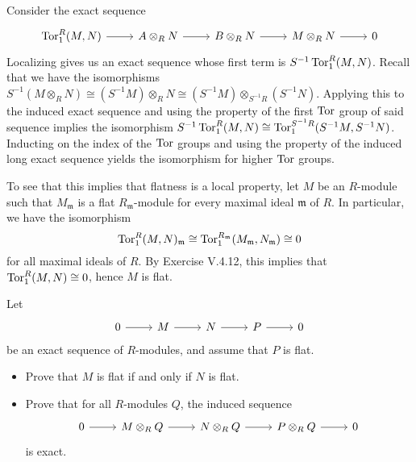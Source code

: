 \documentclass[../../master.tex]{subfiles}
\begin{document}
\begin{solution}
    Consider the exact sequence
    \[
    \begin{tikzcd}
        \Tor_1^{R}(M, N) & A \otimes_R N & B \otimes_R N & M \otimes_R N & 0
        \arrow[from=1-1, to=1-2]
        \arrow[from=1-2, to=1-3]
        \arrow[from=1-3, to=1-4]
        \arrow[from=1-4, to=1-5] 
    \end{tikzcd}
    \]
    Localizing gives us an exact sequence whose first term is $S^{-1}\operatorname{Tor}_1^{R}(M, N)$.
    Recall that we have the isomorphisms $S^{-1}(M \otimes_R N) \cong (S^{-1}M) \otimes_R N \cong (S^{-1}M) \otimes_{S^{-1}R} (S^{-1}N)$.
    Applying this to the induced exact sequence and using the property of the first $\operatorname{Tor}$ group of said sequence implies the isomorphism $S^{-1}\operatorname{Tor}_1^{R}(M, N) \cong \operatorname{Tor}_1^{S^{-1}R}(S^{-1}M, S^{-1}N)$.
    Inducting on the index of the $\operatorname{Tor}$ groups and using the property of the induced long exact sequence yields the isomorphism for higher $\operatorname{Tor}$ groups.

    To see that this implies that flatness is a local property, let $M$ be an $R$-module such that $M_{\mathfrak{m}}$ is a flat $R_{\mathfrak{m}}$-module for every maximal ideal $\mathfrak{m}$ of $R$.
    In particular, we have the isomorphism
    \[
        \operatorname{Tor}_1^{R}(M, N)_\mathfrak{m} \cong \operatorname{Tor}_1^{R_{\mathfrak{m}}}(M_{\mathfrak{m}}, N_{\mathfrak{m}}) \cong 0
    \]
    for all maximal ideals of $R$.
    By Exercise V.4.12, this implies that $\operatorname{Tor}_1^{R}(M, N) \cong 0$, hence $M$ is flat.
\end{solution}

\begin{problem}
    Let
    \[
    \begin{tikzcd}
        0 & M & N & P & 0
        \arrow[from=1-1, to=1-2]
        \arrow[from=1-2, to=1-3]
        \arrow[from=1-3, to=1-4]
        \arrow[from=1-4, to=1-5] 
    \end{tikzcd}
    \]
    be an exact sequence of $R$-modules, and assume that $P$ is flat.
    \begin{itemize}
        \item Prove that $M$ is flat if and only if $N$ is flat.
        \item Prove that for all $R$-modules $Q$, the induced sequence
            \[
            \begin{tikzcd}
                0 & M \otimes_R Q & N \otimes_R Q & P \otimes_R Q & 0
                \arrow[from=1-1, to=1-2]
                \arrow[from=1-2, to=1-3]
                \arrow[from=1-3, to=1-4]
                \arrow[from=1-4, to=1-5] 
            \end{tikzcd}
            \]
            is exact.
    \end{itemize}
\end{problem}
\end{document}

